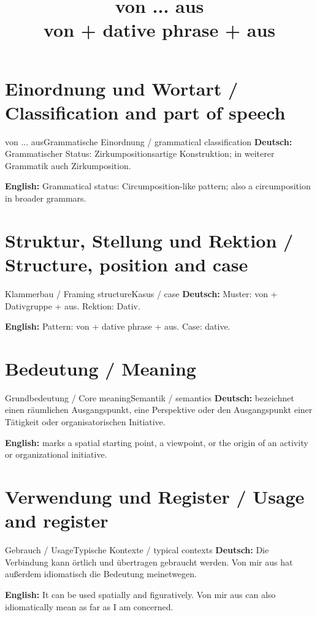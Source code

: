 \documentclass[a4paper,11pt]{article}
\title{von ... aus\\ \large von + dative phrase + aus}
\date{}
\newcommand{\GermanText}[1]{\textbf{Deutsch: }#1\par}
\newcommand{\EnglishText}[1]{{\small\color{SoftGray}\textbf{English: }#1\par}}
\begin{document}
\maketitle
\tableofcontents
\newpage
\section{Einordnung und Wortart / Classification and part of speech}
\begin{grammarentry}{von ... aus}{Grammatische Einordnung / grammatical classification}
\GermanText{Grammatischer Status: Zirkumpositionsartige Konstruktion; in weiterer Grammatik auch Zirkumposition.}
\EnglishText{Grammatical status: Circumposition-like pattern; also a circumposition in broader grammars.}
\end{grammarentry}
\section{Struktur, Stellung und Rektion / Structure, position and case}
\begin{grammarentry}{Klammerbau / Framing structure}{Kasus / case}
\GermanText{Muster: von + Dativgruppe + aus. Rektion: Dativ.}
\EnglishText{Pattern: von + dative phrase + aus. Case: dative.}
\end{grammarentry}
\section{Bedeutung / Meaning}
\begin{grammarentry}{Grundbedeutung / Core meaning}{Semantik / semantics}
\GermanText{bezeichnet einen räumlichen Ausgangspunkt, eine Perspektive oder den Ausgangspunkt einer Tätigkeit oder organisatorischen Initiative.}
\EnglishText{marks a spatial starting point, a viewpoint, or the origin of an activity or organizational initiative.}
\end{grammarentry}
\section{Verwendung und Register / Usage and register}
\begin{grammarentry}{Gebrauch / Usage}{Typische Kontexte / typical contexts}
\GermanText{Die Verbindung kann örtlich und übertragen gebraucht werden. Von mir aus hat außerdem idiomatisch die Bedeutung meinetwegen.}
\EnglishText{It can be used spatially and figuratively. Von mir aus can also idiomatically mean as far as I am concerned.}
\end{grammarentry}
\end{document}

